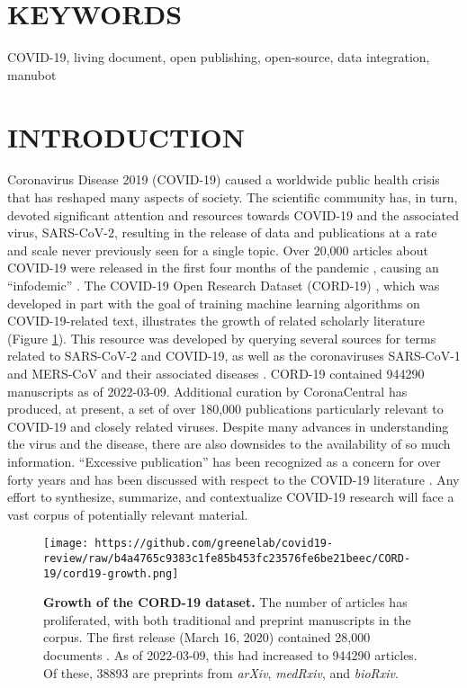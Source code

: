 \documentclass[twocolumn]{ceurart}
\begin{document}
\hypertarget{keywords}{%
\section*{KEYWORDS}\label{keywords}}

COVID-19, living document, open publishing, open-source, data integration, manubot

\hypertarget{introduction}{%
\section{INTRODUCTION}\label{introduction}}

Coronavirus Disease 2019 (COVID-19) caused a worldwide public health crisis that has reshaped many aspects of society.
The scientific community has, in turn, devoted significant attention and resources towards COVID-19 and the associated virus, SARS-CoV-2, resulting in the release of data and publications at a rate and scale never previously seen for a single topic.
Over 20,000 articles about COVID-19 were released in the first four months of the pandemic \citep{7ub6VM4Z}, causing an ``infodemic'' \citep{7ub6VM4Z, nnfOazAC}.
The COVID-19 Open Research Dataset (CORD-19) \citep{CiOwklc6}, which was developed in part with the goal of training machine learning algorithms on COVID-19-related text, illustrates the growth of related scholarly literature (Figure \ref{fig:cord19-growth}).
This resource was developed by querying several sources for terms related to SARS-CoV-2 and COVID-19, as well as the coronaviruses SARS-CoV-1 and MERS-CoV and their associated diseases \citep{CiOwklc6}.
CORD-19 contained 944290 manuscripts as of 2022-03-09.
Additional curation by CoronaCentral \citep{Ybg667S0} has produced, at present, a set of over 180,000 publications particularly relevant to COVID-19 and closely related viruses.
Despite many advances in understanding the virus and the disease, there are also downsides to the availability of so much information.
``Excessive publication'' has been recognized as a concern for over forty years \citep{DfSr1Ohc} and has been discussed with respect to the COVID-19 literature \citep{dUvvJvv6}.
Any effort to synthesize, summarize, and contextualize COVID-19 research will face a vast corpus of potentially relevant material.

\begin{figure}
\hypertarget{fig:cord19-growth}{%
\centering
\texttt{[image: https://github.com/greenelab/covid19-review/raw/b4a4765c9383c1fe85b453fc23576fe6be21beec/CORD-19/cord19-growth.png]}
\caption{\textbf{Growth of the CORD-19 dataset.}
The number of articles has proliferated, with both traditional and preprint manuscripts in the corpus.
The first release (March 16, 2020) contained 28,000 documents \citep{CiOwklc6}.
As of 2022-03-09, this had increased to 944290 articles.
Of these, 38893 are preprints from \emph{arXiv}, \emph{medRxiv}, and \emph{bioRxiv}.}\label{fig:cord19-growth}
}
\end{figure}
\end{document}

